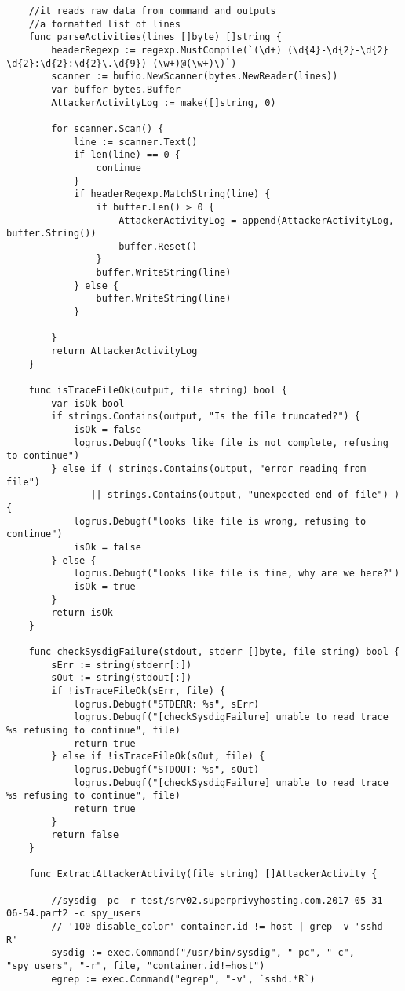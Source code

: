 \begin{verbatim}
    //it reads raw data from command and outputs
    //a formatted list of lines
    func parseActivities(lines []byte) []string {
        headerRegexp := regexp.MustCompile(`(\d+) (\d{4}-\d{2}-\d{2} \d{2}:\d{2}:\d{2}\.\d{9}) (\w+)@(\w+)\)`)
        scanner := bufio.NewScanner(bytes.NewReader(lines))
        var buffer bytes.Buffer
        AttackerActivityLog := make([]string, 0)
    
        for scanner.Scan() {
            line := scanner.Text()
            if len(line) == 0 {
                continue
            }
            if headerRegexp.MatchString(line) {
                if buffer.Len() > 0 {
                    AttackerActivityLog = append(AttackerActivityLog, buffer.String())
                    buffer.Reset()
                }
                buffer.WriteString(line)
            } else {
                buffer.WriteString(line)
            }
    
        }
        return AttackerActivityLog
    }
    
    func isTraceFileOk(output, file string) bool {
        var isOk bool
        if strings.Contains(output, "Is the file truncated?") {
            isOk = false
            logrus.Debugf("looks like file is not complete, refusing to continue")
        } else if ( strings.Contains(output, "error reading from file") 
               || strings.Contains(output, "unexpected end of file") ) {
            logrus.Debugf("looks like file is wrong, refusing to continue")
            isOk = false
        } else {
            logrus.Debugf("looks like file is fine, why are we here?")
            isOk = true
        }
        return isOk
    }
    
    func checkSysdigFailure(stdout, stderr []byte, file string) bool {
        sErr := string(stderr[:])
        sOut := string(stdout[:])
        if !isTraceFileOk(sErr, file) {
            logrus.Debugf("STDERR: %s", sErr)
            logrus.Debugf("[checkSysdigFailure] unable to read trace %s refusing to continue", file)
            return true
        } else if !isTraceFileOk(sOut, file) {
            logrus.Debugf("STDOUT: %s", sOut)
            logrus.Debugf("[checkSysdigFailure] unable to read trace %s refusing to continue", file)
            return true
        }
        return false
    }
    
    func ExtractAttackerActivity(file string) []AttackerActivity {
    
        //sysdig -pc -r test/srv02.superprivyhosting.com.2017-05-31-06-54.part2 -c spy_users
        // '100 disable_color' container.id != host | grep -v 'sshd -R'
        sysdig := exec.Command("/usr/bin/sysdig", "-pc", "-c", "spy_users", "-r", file, "container.id!=host")
        egrep := exec.Command("egrep", "-v", `sshd.*R`)
    

\end{verbatim}
